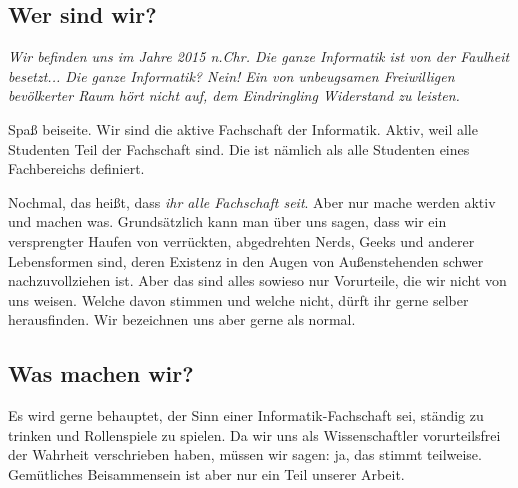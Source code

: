 
\subsection{Wer sind wir?}
    \glqq\textit{Wir befinden uns im Jahre 2015 n.Chr. Die ganze Informatik ist von der Faulheit besetzt... Die ganze Informatik? Nein! Ein von unbeugsamen Freiwilligen bevölkerter Raum hört nicht auf, dem Eindringling  Widerstand zu leisten.} \grqq

    Spaß beiseite. Wir sind die aktive Fachschaft der Informatik. Aktiv, weil alle Studenten Teil der Fachschaft sind. Die ist n\"amlich als alle Studenten eines Fachbereichs definiert.

    Nochmal, das hei{\ss}t, dass \emph{ihr alle Fachschaft seit}. Aber nur mache werden aktiv und machen was. %
    Grundsätzlich kann man über uns sagen, dass wir ein versprengter Haufen von verrückten, abgedrehten Nerds, Geeks und anderer Lebensformen sind, deren Existenz in den Augen von Außenstehenden schwer nachzuvollziehen ist.
    Aber das sind alles sowieso nur Vorurteile, die wir nicht von uns weisen. Welche davon stimmen und welche nicht, dürft ihr gerne selber herausfinden. Wir bezeichnen uns aber gerne als normal. 	



\subsection{Was machen wir?}
    Es wird gerne behauptet, der Sinn einer Informatik-Fachschaft sei, st\"andig zu trinken und Rollenspiele zu spielen.
    Da wir uns als Wissenschaftler vorurteilsfrei der Wahrheit verschrieben haben, m\"ussen wir sagen: ja, das stimmt teilweise.
    Gem\"utliches Beisammensein ist aber nur ein Teil unserer Arbeit.
    
